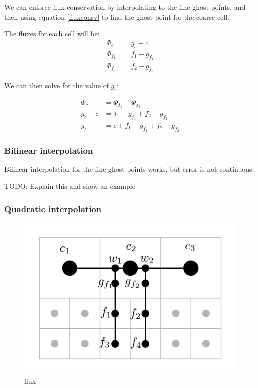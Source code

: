 \documentclass[12pt]{article}
\begin{document}
We can enforce flux conservation by interpolating to the fine ghost points, and then using equation
\ref{fluxconsv} to find the ghost point for the coarse cell.

The fluxes for each cell will be:
\begin{align}
    \Phi_c&=g_c-c\\
    \Phi_{f_1}&=f_1-g_{f_1}\\
    \Phi_{f_2}&=f_2-g_{f_2}
\end{align}

We can then solve for the value of $g_c$:

\begin{align}
    \Phi_{c}&=\Phi_{f_1}+\Phi_{f_2}\\
    g_c-c   &=f_1-g_{f_1}+f_2-g_{f_2}\\
    g_c     &=c+f_1-g_{f_1}+f_2-g_{f_2}
    \label{ghostconsv}
\end{align}

\subsubsection*{Bilinear interpolation}

Bilinear interpolation for the fine ghost points works, but error is not continuous.

TODO: Explain this and show an example

\subsubsection*{Quadratic interpolation}



\begin{figure}[H]
    \centering
    \includegraphics[width=5in]{images/quadstencil.pdf}
    \caption{flux}
\end{figure}
\end{document}
